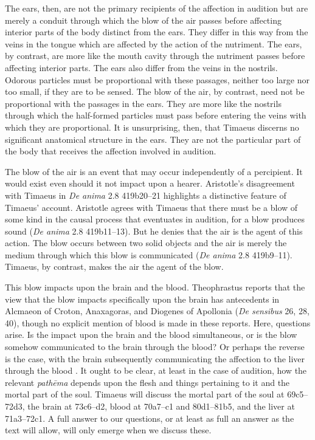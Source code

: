 The ears, then, are not the primary recipients of the affection in audition but are merely a conduit through which the blow of the air passes before affecting interior parts of the body distinct from the ears. They differ in this way from the veins in the tongue which are affected by the action of the nutriment. The ears, by contrast, are more like the mouth cavity through the nutriment passes before affecting interior parts. The ears also differ from the veins in the nostrils. Odorous particles must be proportional with these passages, neither too large nor too small, if they are to be sensed. The blow of the air, by contrast, need not be proportional with the passages in the ears. They are more like the nostrils through which the half-formed particles must pass before entering the veins with which they are proportional. It is unsurprising, then, that Timaeus discerns no significant anatomical structure in the ears. They are not the particular part of the body that receives the affection involved in audition.

The blow of the air is an event that may occur independently of a percipient. It would exist even should it not impact upon a hearer. Aristotle's disagreement with Timaeus in \emph{De anima} 2.8 419b20--21 highlights a distinctive feature of Timaeus' account. Aristotle agrees with Timaeus that there must be a blow of some kind in the causal process that eventuates in audition, for a blow produces sound (\emph{De anima} 2.8 419b11--13). But he denies that the air is the agent of this action. The blow occurs between two solid objects and the air is merely the medium through which this blow is communicated (\emph{De anima} 2.8 419b9--11). Timaeus, by contrast, makes the air the agent of the blow. 

This blow impacts upon the brain and the blood. Theophrastus reports that the view that the blow impacts specifically upon the brain has antecedents in Alcmaeon of Croton, Anaxagoras, and Diogenes of Apollonia (\emph{De sensibus} 26, 28, 40), though no explicit mention of blood is made in these reports. Here, questions arise. Is the impact upon the brain and the blood simultaneous, or is the blow somehow communicated to the brain through the blood? Or perhaps the reverse is the case, with the brain subsequently communicating the affection to the liver through the blood \citep[477]{Taylor:1928qb}. It ought to be clear, at least in the case of audition, how the relevant \emph{pathēma} depends upon the flesh and things pertaining to it and the mortal part of the soul. Timaeus will discuss the mortal part of the soul at 69c5--72d3, the brain at 73c6--d2, blood at 70a7--c1 and 80d1--81b5, and the liver at 71a3--72c1. A full answer to our questions, or at least as full an answer as the text will allow, will only emerge when we discuss these.

